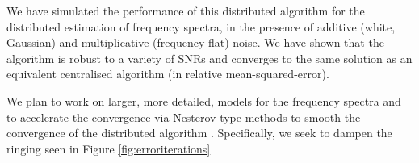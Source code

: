 We have simulated the performance of this distributed algorithm for the distributed estimation of frequency spectra, in the presence of additive (white, Gaussian) and multiplicative (frequency flat) noise. We have shown that the algorithm is robust to a variety of SNRs and converges to the same solution as an equivalent centralised algorithm (in relative mean-squared-error).

We plan to work on larger, more detailed, models for the frequency spectra and to accelerate the convergence via Nesterov type methods to smooth the convergence of the distributed algorithm \cite{goldstein2014fast}. Specifically, we seek to dampen the ringing seen in Figure \ref{fig:erroriterations}